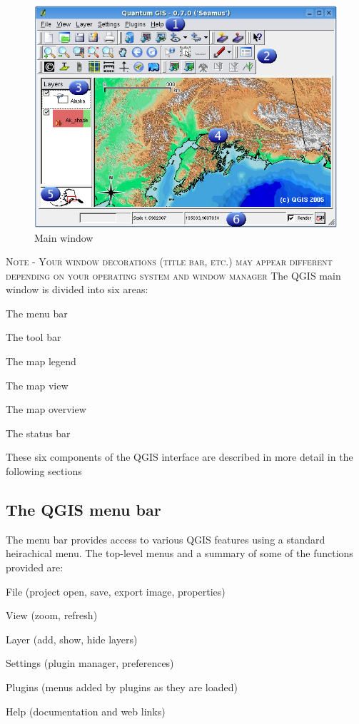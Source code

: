 \begin{figure}[h]
   \begin{center}
   \caption{Main window}\label{fig:startup}
   \includegraphics[scale=.7]{qgis_user_guide_images/startup}
\end{center}  
   
\end{figure}
\textsc{Note - Your window decorations (title bar, etc.) may appear different depending on your operating system and window manager}
The QGIS main window is divided into six areas:
\begin{compactenum}
\item The menu bar
\item The tool bar
\item The map legend
\item The map view
\item The map overview
\item The status bar
\end{compactenum}

These six components of the QGIS interface are described in more detail in the following sections
\subsection{The QGIS menu bar}
The menu bar provides access to various QGIS features using a standard 
heirachical menu. The top-level menus and a summary of some of the functions provided are:
\begin{compactitem}
\item File (project open, save, export image, properties)
\item View (zoom, refresh)
\item Layer (add, show, hide layers)
\item Settings (plugin manager, preferences)
\item Plugins (menus added by plugins as they are loaded)
\item Help (documentation and web links)
\end{compactitem}


